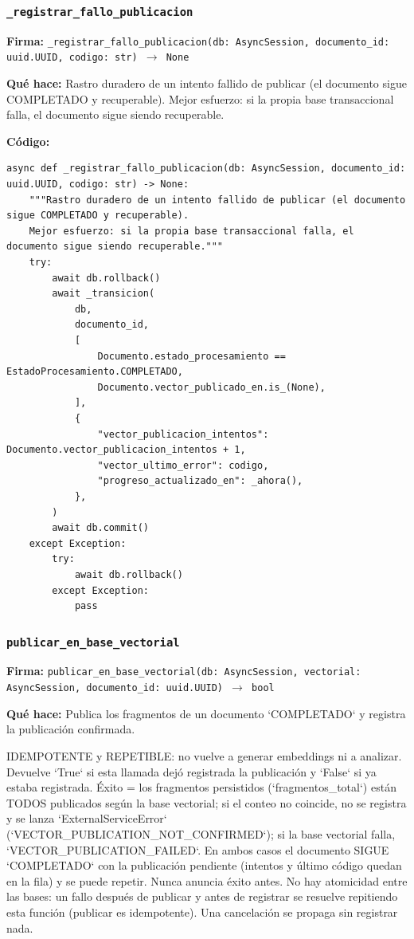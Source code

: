 \documentclass[11pt,a4paper]{article}
\begin{document}
\subsubsection*{\texttt{\_registrar\_fallo\_publicacion}}
\textbf{Firma:} \texttt{\_registrar\_fallo\_publicacion(db: AsyncSession, documento\_id: uuid.UUID, codigo: str) $\rightarrow$ None}

\textbf{Qué hace:} Rastro duradero de un intento fallido de publicar (el documento sigue COMPLETADO y recuperable).
Mejor esfuerzo: si la propia base transaccional falla, el documento sigue siendo recuperable.

\textbf{Código:}
\begin{lstlisting}
async def _registrar_fallo_publicacion(db: AsyncSession, documento_id: uuid.UUID, codigo: str) -> None:
    """Rastro duradero de un intento fallido de publicar (el documento sigue COMPLETADO y recuperable).
    Mejor esfuerzo: si la propia base transaccional falla, el documento sigue siendo recuperable."""
    try:
        await db.rollback()
        await _transicion(
            db,
            documento_id,
            [
                Documento.estado_procesamiento == EstadoProcesamiento.COMPLETADO,
                Documento.vector_publicado_en.is_(None),
            ],
            {
                "vector_publicacion_intentos": Documento.vector_publicacion_intentos + 1,
                "vector_ultimo_error": codigo,
                "progreso_actualizado_en": _ahora(),
            },
        )
        await db.commit()
    except Exception:
        try:
            await db.rollback()
        except Exception:
            pass
\end{lstlisting}

\subsubsection*{\texttt{publicar\_en\_base\_vectorial}}
\textbf{Firma:} \texttt{publicar\_en\_base\_vectorial(db: AsyncSession, vectorial: AsyncSession, documento\_id: uuid.UUID) $\rightarrow$ bool}

\textbf{Qué hace:} Publica los fragmentos de un documento `COMPLETADO` y registra la publicación confirmada.

IDEMPOTENTE y REPETIBLE: no vuelve a generar embeddings ni a analizar. Devuelve `True` si esta llamada
dejó registrada la publicación y `False` si ya estaba registrada. Éxito = los fragmentos persistidos
(`fragmentos\_total`) están TODOS publicados según la base vectorial; si el conteo no coincide, no se
registra y se lanza `ExternalServiceError` (`VECTOR\_PUBLICATION\_NOT\_CONFIRMED`); si la base vectorial
falla, `VECTOR\_PUBLICATION\_FAILED`. En ambos casos el documento SIGUE `COMPLETADO` con la publicación
pendiente (intentos y último código quedan en la fila) y se puede repetir. Nunca anuncia éxito antes.
No hay atomicidad entre las bases: un fallo después de publicar y antes de registrar se resuelve
repitiendo esta función (publicar es idempotente). Una cancelación se propaga sin registrar nada.
\end{document}

